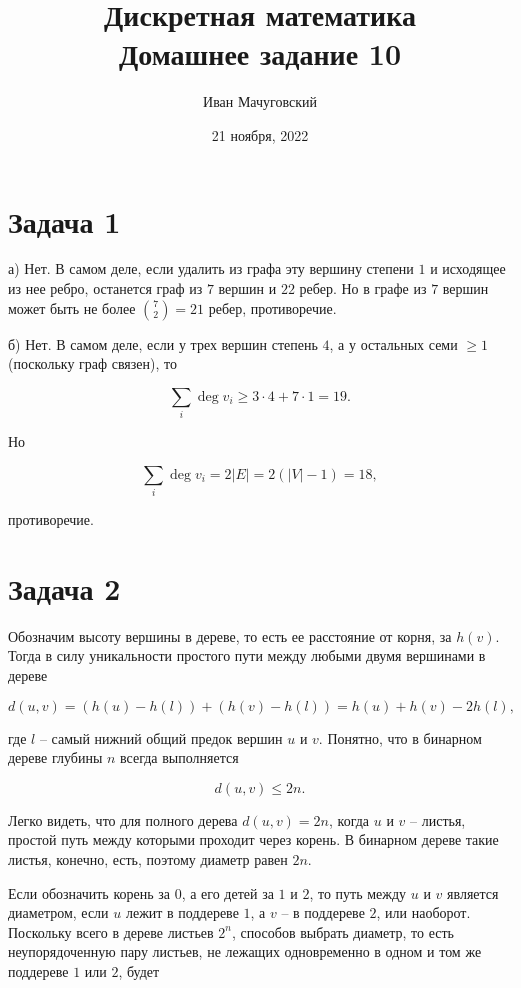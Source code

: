 \documentclass{article}
\date{21 ноября, 2022}
\title{Дискретная математика \\ \Large Домашнее задание 10}
\author{Иван Мачуговский}
\newcommand{\abs}[1]{\left\lvert#1\right\rvert}
\begin{document}
	\maketitle

	\section*{Задача 1}

	а) Нет. В самом деле, если удалить из графа эту вершину степени $1$ и исходящее из нее ребро, останется граф из $7$ вершин и $22$ ребер. Но в графе из $7$ вершин может быть не более $\binom{7}{2} = 21$ ребер, противоречие.

	б) Нет. В самом деле, если у трех вершин степень $4$, а у остальных семи $\ge 1$ (поскольку граф связен), то

	\begin{equation*}
		\sum_i \deg v_i \ge 3 \cdot 4 + 7 \cdot 1 = 19.
	\end{equation*}

	Но

	\begin{equation*}
		\sum_i \deg v_i = 2 \abs{E} = 2 (\abs{V} - 1) = 18,
	\end{equation*}

	противоречие.


	\section*{Задача 2}

	Обозначим высоту вершины в дереве, то есть ее расстояние от корня, за $h(v)$. Тогда в силу уникальности простого пути между любыми двумя вершинами в дереве

	\begin{equation*}
		d(u, v) = (h(u) - h(l)) + (h(v) - h(l)) = h(u) + h(v) - 2 h(l),
	\end{equation*}

	где $l$ -- самый нижний общий предок вершин $u$ и $v$. Понятно, что в бинарном дереве глубины $n$ всегда выполняется

	\begin{equation*}
		d(u, v) \le 2n.
	\end{equation*}

	Легко видеть, что для полного дерева $d(u, v) = 2n$, когда $u$ и $v$ -- листья, простой путь между которыми проходит через корень. В бинарном дереве такие листья, конечно, есть, поэтому диаметр равен $2n$.

	Если обозначить корень за $0$, а его детей за $1$ и $2$, то путь между $u$ и $v$ является диаметром, если $u$ лежит в поддереве $1$, а $v$ -- в поддереве $2$, или наоборот. Поскольку всего в дереве листьев $2^n$, способов выбрать диаметр, то есть неупорядоченную пару листьев, не лежащих одновременно в одном и том же поддереве $1$ или $2$, будет
\end{document}
